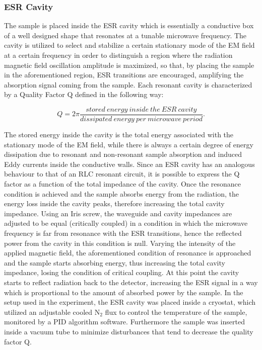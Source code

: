 \documentclass[journal]{IEEEtran}
\begin{document}
\subsubsection{ESR Cavity}

The sample is placed inside the ESR cavity which is essentially a conductive box of a well designed shape that resonates at a tunable microwave frequency. The cavity is utilized to select and stabilize a certain stationary mode of the EM field at a certain frequency in order to distinguish a region where the radiation magnetic field oscillation amplitude is maximized, so that, by placing the sample in the aforementioned region, ESR transitions are encouraged, amplifying the absorption signal coming from the sample. Each resonant cavity is characterized by a Quality Factor Q defined in the following way:

\begin{equation}
    Q = 2\pi\frac{stored \: energy \: inside \: the \: ESR \: cavity}{dissipated \: energy \: per \: microwave \: period}.
\end{equation}

\noindent The stored energy inside the cavity is the total energy associated with the stationary mode of the EM field, while there is always a certain degree of energy dissipation due to resonant and non-resonant sample absorption and induced Eddy currents inside the conductive walls. Since an ESR cavity has an analogous behaviour to that of an RLC resonant circuit, it is possible to express the Q factor as a function of the total impedance of the cavity. Once the resonance condition is achieved and the sample absorbs energy from the radiation, the energy loss inside the cavity peaks, therefore increasing the total cavity impedance. Using an Iris screw, the waveguide and cavity impedances are adjusted to be equal (critically coupled) in a condition in which the microwave frequency is far from resonance with the ESR transitions, hence the reflected power from the cavity in this condition is null. Varying the intensity of the applied magnetic field, the aforementioned condition of resonance is approached and the sample starts absorbing energy, thus increasing the total cavity impedance, losing the condition of critical coupling. At this point the cavity starts to reflect radiation back to the detector, increasing the ESR signal in a way which is proportional to the amount of absorbed power by the sample. In the setup used in the experiment, the ESR cavity was placed inside a cryostat, which utilized an adjustable cooled N$_2$ flux to control the temperature of the sample, monitored by a PID algorithm software. Furthermore the sample was inserted inside a vacuum tube to minimize disturbances that tend to decrease the quality factor Q.
\end{document}
